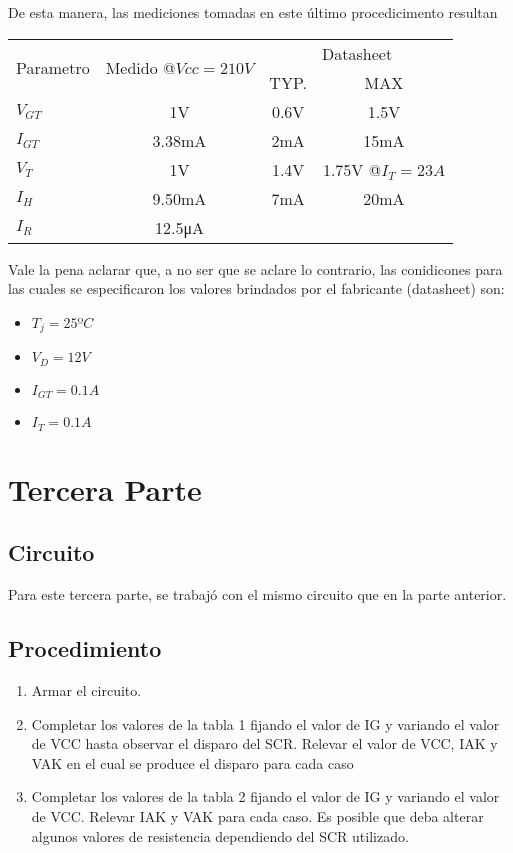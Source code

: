 De esta manera, las mediciones tomadas en este último procedicimento resultan
\begin{table}[H]
  \begin{center}
    \begin{tabular}{l|c|c|c}
      \multirow{2}{*}{Parametro} &\multirow{2}{*}{Medido @$Vcc=210V$}  &\multicolumn{2}{c}{Datasheet}  \\
      \cline{3-4}
                &  &TYP. &MAX  \\
      \hline
      $V_{GT}$  &1V      &0.6V   &1.5V  \\
      $I_{GT}$  &3.38mA  &2mA   &15mA  \\
      $V_{T}$   &1V      &1.4V   &1.75V @$I_T=23A$  \\
      $I_{H}$   &9.50mA  &7mA   &20mA  \\
      $I_{R}$   &12.5\unit{\micro\ampere} & &
    \end{tabular}
  \end{center} 
\end{table}
Vale la pena aclarar que, a no ser que se aclare lo contrario, las conidicones para las cuales se especificaron los 
valores brindados por el fabricante (datasheet) son:
\begin{itemize}
  \item $T_j=25ºC$ 
  \item $V_D=12V$ 
  \item $I_{GT}=0.1A$ 
  \item $I_{T}=0.1A$ 
\end{itemize}

\section{Tercera Parte}
\subsection{Circuito}
Para este tercera parte, se trabajó con el mismo circuito que en la parte anterior.
\subsection{Procedimiento}
\begin{enumerate}
  \item Armar el circuito.
  \item Completar los valores de la tabla 1 fijando el valor de IG y variando el valor
    de VCC hasta observar el disparo del SCR. Relevar el valor de VCC, IAK y VAK
    en el cual se produce el disparo para cada caso 
  \item Completar los valores de la tabla 2 fijando el valor de IG y variando el valor
    de VCC. Relevar IAK y VAK para cada caso. Es posible que deba alterar
    algunos valores de resistencia dependiendo del SCR utilizado.
\end{enumerate}
